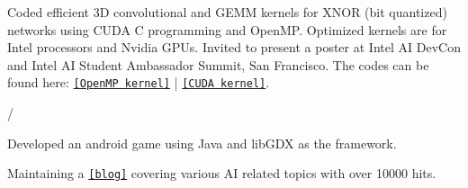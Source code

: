 \documentclass[]{deedy-resume-openfont}
\begin{document}
Coded efficient 3D convolutional and GEMM kernels for XNOR (bit quantized) networks using CUDA C programming and OpenMP. Optimized kernels are for Intel processors and Nvidia GPUs. Invited to present a poster at Intel AI DevCon and Intel AI Student Ambassador Summit, San Francisco. The codes can be found here: \href{https://github.com/akhauriyash/XNOR-Intel-ISA}{\texttt{[OpenMP kernel]}} | \href{https://github.com/akhauriyash/XNOR-convolution}{\texttt{[CUDA kernel]}}.\\
\sectionsep


/
\sectionsep

Developed an android game using Java and libGDX as the framework. \\
\sectionsep

Maintaining a \href{https://quirkyai.wordpress.com}{\texttt{[blog]}} covering various AI   related topics with over 10000 hits. \\
\sectionsep


\end{document}
